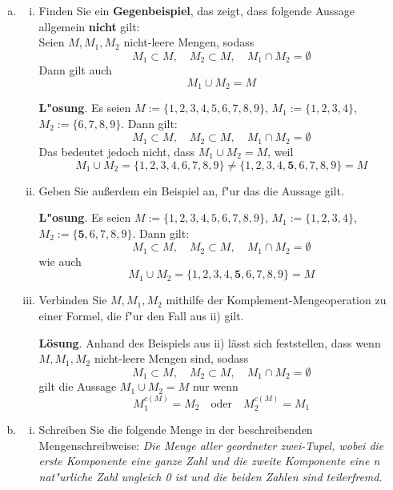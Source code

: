 \documentclass[10pt, a4paper, oneside]{article}
\begin{document}
\begin{enumerate}[(a)]
    \item \begin{enumerate}[i)]
            \item Finden Sie ein \textbf{Gegenbeispiel}, das zeigt, dass
                folgende Aussage allgemein \textbf{nicht} gilt:\\
                Seien $M,M_1,M_2$ nicht-leere Mengen, sodass
                $$M_1 \subset M, \quad M_2 \subset M, \quad M_1 \cap M_2 = \emptyset$$
                Dann gilt auch
                $$M_1 \cup M_2 = M$$

                \textbf{L"osung}.
                Es seien $M := \{ 1, 2, 3, 4, 5, 6, 7, 8, 9 \}$, $M_1 := \{1,
                2, 3, 4\}$, $M_2 := \{6, 7, 8, 9\}$. Dann gilt:
                $$M_1 \subset M, \quad M_2 \subset M, \quad M_1 \cap M_2 = \emptyset$$
                Das bedeutet jedoch nicht, dass $M_1 \cup M_2 = M$, weil
                $$M_1 \cup M_2 = \{ 1, 2, 3, 4, 6, 7, 8, 9 \} \neq \{1, 2, 3, 4, \textbf{5}, 6, 7, 8, 9\} = M $$

            \item Geben Sie au{\ss}erdem ein Beispiel an, f"ur das die Aussage gilt.

                \textbf{L"osung}.
                Es seien $M := \{ 1, 2, 3, 4, 5, 6, 7, 8, 9 \}$, $M_1 := \{1,
                2, 3, 4\}$, $M_2 := \{\textbf{5}, 6, 7, 8, 9\}$. Dann gilt:
                $$M_1 \subset M, \quad M_2 \subset M, \quad M_1 \cap M_2 = \emptyset$$
                wie auch
                $$M_1 \cup M_2 = \{1, 2, 3, 4, \textbf{5}, 6, 7, 8, 9\} = M$$

            \item Verbinden Sie $M, M_1, M_2$ mithilfe der
                Komplement-Mengeoperation zu einer Formel, die f"ur den Fall
                aus ii) gilt.

                \textbf{Lösung}. Anhand des Beispiels aus ii) lässt sich feststellen, dass
                wenn $M,M_1,M_2$ nicht-leere Mengen sind, sodass
                $$M_1 \subset M, \quad M_2 \subset M, \quad M_1 \cap M_2 = \emptyset$$
                gilt die Aussage $M_1 \cup M_2 = M$ nur wenn
                $$M_1^{c(M)} = M_2 \quad\text{oder}\quad M_2^{c(M)} = M_1$$
          \end{enumerate}
    \item \begin{enumerate}[i)]
            \item  Schreiben Sie die folgende Menge in der beschreibenden Mengenschreibweise:
                \textit{Die Menge aller geordneter zwei-Tupel, wobei die erste
                Komponente eine ganze Zahl und die zweite Komponente eine n
                nat"urliche Zahl ungleich 0 ist und die beiden Zahlen sind
                teilerfremd}.


\end{enumerate}
\end{enumerate}
\end{document}
